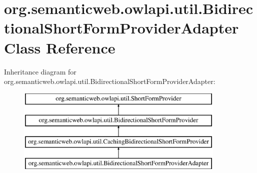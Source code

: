 \hypertarget{classorg_1_1semanticweb_1_1owlapi_1_1util_1_1_bidirectional_short_form_provider_adapter}{\section{org.\-semanticweb.\-owlapi.\-util.\-Bidirectional\-Short\-Form\-Provider\-Adapter Class Reference}
\label{classorg_1_1semanticweb_1_1owlapi_1_1util_1_1_bidirectional_short_form_provider_adapter}
}
Inheritance diagram for org.\-semanticweb.\-owlapi.\-util.\-Bidirectional\-Short\-Form\-Provider\-Adapter\-:\begin{figure}[H]
\begin{center}
\leavevmode
\includegraphics[height=4.000000cm]{classorg_1_1semanticweb_1_1owlapi_1_1util_1_1_bidirectional_short_form_provider_adapter}
\end{center}
\end{figure}
